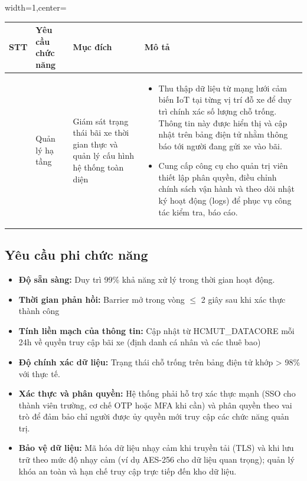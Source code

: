 \newpage
\begin{adjustbox}{width=1\textwidth,center=\textwidth}
    \small
    \begin{tabular}{|>{\centering\arraybackslash}m{1cm}|>{\centering\arraybackslash}m{3cm}|>{\centering\arraybackslash}m{4.7cm}|>{\centering\arraybackslash}m{7cm}|}
    \hline
    \textbf{STT} & \textbf{Yêu cầu chức năng} & \textbf{Mục đích} & \textbf{Mô tả}\\
    \hline
    3 & Quản lý hạ tầng & Giám sát trạng thái bãi xe thời gian thực và quản lý cấu hình hệ thống toàn diện & \begin{itemize}[leftmargin=0pt, label={}]
        \item Thu thập dữ liệu từ mạng lưới cảm biến IoT tại từng vị trí đỗ xe để duy trì chính xác số lượng chỗ trống. Thông tin này được hiển thị và cập nhật trên bảng điện tử nhằm thông báo tới người đang gửi xe vào bãi.
        \item Cung cấp công cụ cho quản trị viên thiết lập phân quyền, điều chỉnh chính sách vận hành và theo dõi nhật ký hoạt động (logs) để phục vụ công tác kiểm tra, báo cáo.
    \end{itemize} \\
    \hline
    \end{tabular}
\end{adjustbox}
\subsection{Yêu cầu phi chức năng}
\begin{itemize}
    \item \textbf{Độ sẵn sàng:} Duy trì 99\% khả năng xử lý trong thời gian hoạt động.
    \vspace{-10pt}
    \item \textbf{Thời gian phản hồi:} Barrier mở trong vòng $\le$ 2 giây sau khi xác thực thành công
    \vspace{-10pt}
    \item \textbf{Tính liền mạch của thông tin:} Cập nhật từ HCMUT\_DATACORE mỗi 24h về quyền truy cập bãi xe (định danh cá nhân và các thuê bao)
    \vspace{-10pt}
    \item \textbf{Độ chính xác dữ liệu:} Trạng thái chỗ trống trên bảng điện tử khớp > 98\% với thực tế.
    \vspace{-10pt}
    \item \textbf{Xác thực và phân quyền:} Hệ thống phải hỗ trợ xác thực mạnh (SSO cho thành viên trường, cơ chế OTP hoặc MFA khi cần) và phân quyền theo vai trò để đảm bảo chỉ người được ủy quyền mới truy cập các chức năng quản trị.
    \vspace{-10pt}
    \item \textbf{Bảo vệ dữ liệu:} Mã hóa dữ liệu nhạy cảm khi truyền tải (TLS) và khi lưu trữ theo mức độ nhạy cảm (ví dụ AES-256 cho dữ liệu quan trọng); quản lý khóa an toàn và hạn chế truy cập trực tiếp đến kho dữ liệu.
\end{itemize}